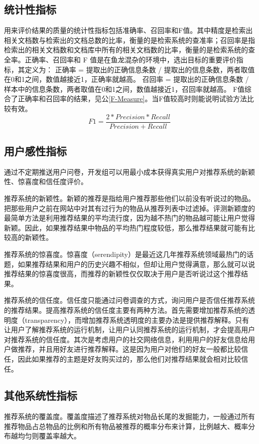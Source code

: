   \subsection{统计性指标}
  用来评价结果的质量的统计性指标包括准确率、召回率和F值。其中精度是检索出相关文档数与检索出的文档总数的比率，衡量的是检索系统的查准率；召回率是指检索出的相关文档数和文档库中所有的相关文档数的比率，衡量的是检索系统的查全率。正确率、召回率和 F 值是在鱼龙混杂的环境中，选出目标的重要评价指标，其定义为：
  正确率 = 提取出的正确信息条数 /  提取出的信息条数，两者取值在0和1之间，数值越接近1，正确率就越高。
  召回率 = 提取出的正确信息条数 /  样本中的信息条数，两者取值在0和1之间，数值越接近1，召回率就越高。
  F值综合了正确率和召回率的结果，见公\autoref{F-Measure}。当F值较高时则能说明试验方法比较有效。
  \begin{equation}
    F1 = \frac{2*Precision*Recall}{Precision+Recall}
    \label{F-Measure}
  \end{equation}

  \subsection{用户感性指标}
  通过不定期推送用户问卷，开发组可以用最小成本获得真实用户对推荐系统的新颖性、惊喜度和信任度评价。

  推荐系统的新颖性。新颖的推荐是指给用户推荐那些他们以前没有听说过的物品。把那些用户之前在网站中对其有过行为的物品从推荐列表中过滤掉。评测新颖度的最简单方法是利用推荐结果的平均流行度，因为越不热门的物品越可能让用户觉得新颖。因此，如果推荐结果中物品的平均热门程度较低，那么推荐结果就可能有比较高的新颖性。

  推荐系统的惊喜度。惊喜度（serendipity）是最近这几年推荐系统领域最热门的话题，如果推荐结果和用户的历史兴趣不相似，但却让用户觉得满意，那么就可以说推荐结果的惊喜度很高，而推荐的新颖性仅仅取决于用户是否听说过这个推荐结果。

  推荐系统的信任度。信任度只能通过问卷调查的方式，询问用户是否信任推荐系统的推荐结果。提高推荐系统的信任度主要有两种方法。首先需要增加推荐系统的透明度（transparency），而增加推荐系统透明度的主要办法是提供推荐解释。只有让用户了解推荐系统的运行机制，让用户认同推荐系统的运行机制，才会提高用户对推荐系统的信任度。其次是考虑用户的社交网络信息，利用用户的好友信息给用户做推荐，并且用好友进行推荐解释。这是因为用户对他们的好友一般都比较信任，因此如果推荐的主题是好友购买过的，那么他们对推荐结果就会相对比较信任。

  \subsection{其他系统性指标}
  推荐系统的覆盖度。覆盖度描述了推荐系统对物品长尾的发掘能力，一般通过所有推荐物品占总物品的比例和所有物品被推荐的概率分布来计算，比例越大、概率分布越均匀则覆盖率越大。

